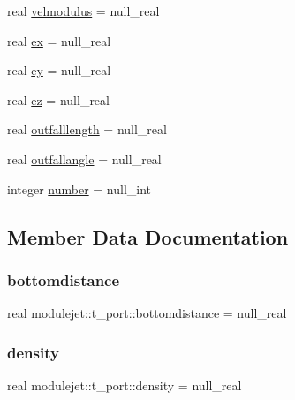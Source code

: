 \begin{DoxyCompactItemize}
\item 
real \mbox{\hyperlink{structmodulejet_1_1t__port_a1edc40d0bde3010c99006f4d235eedfb}{velmodulus}} = null\+\_\+real
\item 
real \mbox{\hyperlink{structmodulejet_1_1t__port_a7577c8ada8397dfc3c95c0ce5721bfb5}{ex}} = null\+\_\+real
\item 
real \mbox{\hyperlink{structmodulejet_1_1t__port_a418a6887612561fb89fbd0ff14faabc9}{ey}} = null\+\_\+real
\item 
real \mbox{\hyperlink{structmodulejet_1_1t__port_a936d2a0253a3e49335c403f096da997d}{ez}} = null\+\_\+real
\item 
real \mbox{\hyperlink{structmodulejet_1_1t__port_a321b81497eb51a06a346bcb8066ec39f}{outfalllength}} = null\+\_\+real
\item 
real \mbox{\hyperlink{structmodulejet_1_1t__port_a5b624da6a149e240847c5aa77ef93aca}{outfallangle}} = null\+\_\+real
\item 
integer \mbox{\hyperlink{structmodulejet_1_1t__port_a23270d2d4ee1258f991c631dd2d2187a}{number}} = null\+\_\+int
\end{DoxyCompactItemize}


\subsection{Member Data Documentation}
\mbox{\label{structmodulejet_1_1t__port_a9c284c9e4765b05a51ec01f3b4a5ef15}} 
\subsubsection{\texorpdfstring{bottomdistance}{bottomdistance}}
{\footnotesize\ttfamily real modulejet\+::t\+\_\+port\+::bottomdistance = null\+\_\+real\hspace{0.3cm}{\ttfamily [private]}}

\mbox{\label{structmodulejet_1_1t__port_ac4f9e11fa194e83f68745db771389179}} 
\subsubsection{\texorpdfstring{density}{density}}
{\footnotesize\ttfamily real modulejet\+::t\+\_\+port\+::density = null\+\_\+real\hspace{0.3cm}{\ttfamily [private]}}

